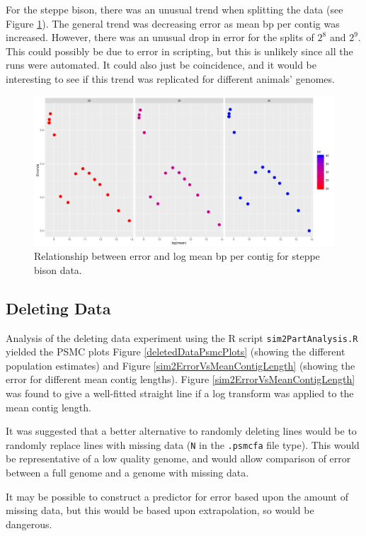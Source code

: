 \documentclass[11pt,a4paper]{article}
\begin{document}
For the steppe bison, there was an unusual trend when splitting the data (see Figure \ref{steppeBisonWeirdTrend}). The general trend was decreasing error as mean bp per contig was increased. However, there was an unusual drop in error for the splits of $2^8$ and $2^9$. This could possibly be due to error in scripting, but this is unlikely since all the runs were automated. It could also just be coincidence, and it would be interesting to see if this trend was replicated for different animals' genomes.

\begin{figure}[h]
  \center
  \includegraphics[width=.7\linewidth]{figures/steppeBisonWeirdTrend.png}
  \caption{Relationship between error and log mean bp per contig for steppe bison data.}\label{steppeBisonWeirdTrend}
\end{figure}

\subsection{Deleting Data}
Analysis of the deleting data experiment using the R script \verb|sim2PartAnalysis.R| yielded the PSMC plots Figure \ref{deletedDataPsmcPlots} (showing the different population estimates) and Figure \ref{sim2ErrorVsMeanContigLength} (showing the error for different mean contig lengths). Figure \ref{sim2ErrorVsMeanContigLength} was found to give a well-fitted straight line if a log transform was applied to the mean contig length.

It was suggested that a better alternative to randomly deleting lines would be to randomly replace lines with missing data (\verb|N| in the \verb|.psmcfa| file type). This would be representative of a low quality genome, and would allow comparison of error between a full genome and a genome with missing data.

It may be possible to construct a predictor for error based upon the amount of missing data, but this would be based upon extrapolation, so would be dangerous.
\end{document}
